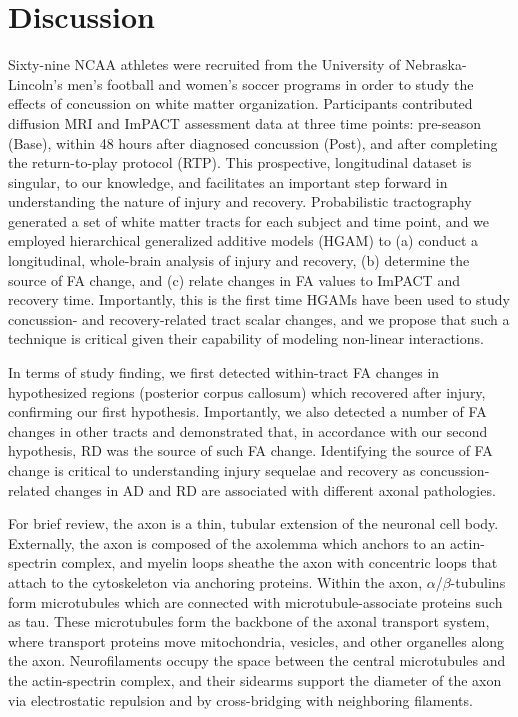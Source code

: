 \documentclass[12pt]{article}
\begin{document}
\section{Discussion}
\label{sec:disc}
Sixty-nine NCAA athletes were recruited from the University of Nebraska-Lincoln's men's football and women's soccer programs in order to study the effects of concussion on white matter organization. Participants contributed diffusion MRI and ImPACT assessment data at three time points: pre-season (Base), within 48 hours after diagnosed concussion (Post), and after completing the return-to-play protocol (RTP). This prospective, longitudinal dataset is singular, to our knowledge, and facilitates an important step forward in understanding the nature of injury and recovery. Probabilistic tractography generated a set of white matter tracts for each subject and time point, and we employed hierarchical generalized additive models (HGAM) to (a) conduct a longitudinal, whole-brain analysis of injury and recovery, (b) determine the source of FA change, and (c) relate changes in FA values to ImPACT and recovery time. Importantly, this is the first time HGAMs have been used to study concussion- and recovery-related tract scalar changes, and we propose that such a technique is critical given their capability of modeling non-linear interactions.

In terms of study finding, we first detected within-tract FA changes in hypothesized regions (posterior corpus callosum) which recovered after injury, confirming our first hypothesis. Importantly, we also detected a number of FA changes in other tracts and demonstrated that, in accordance with our second hypothesis, RD was the source of such FA change. Identifying the source of FA change is critical to understanding injury sequelae and recovery as concussion-related changes in AD and RD are associated with different axonal pathologies.

For brief review, the axon is a thin, tubular extension of the neuronal cell body. Externally, the axon is composed of the axolemma which anchors to an actin-spectrin complex, and myelin loops sheathe the axon with concentric loops that attach to the cytoskeleton via anchoring proteins. Within the axon, $\alpha$/$\beta$-tubulins form microtubules which are connected with microtubule-associate proteins such as tau. These microtubules form the backbone of the axonal transport system, where transport proteins move mitochondria, vesicles, and other organelles along the axon. Neurofilaments occupy the space between the central microtubules and the actin-spectrin complex, and their sidearms support the diameter of the axon via electrostatic repulsion and by cross-bridging with neighboring filaments.
\end{document}
